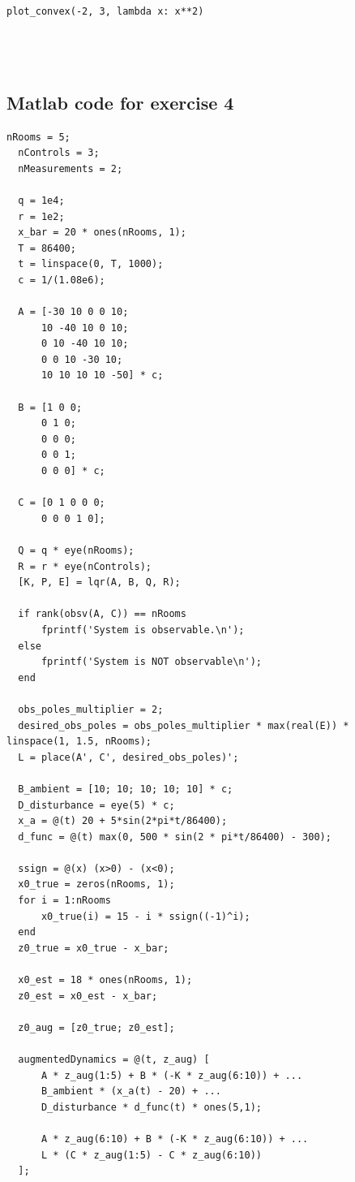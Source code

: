 \documentclass[12pt,A4, onecolumn]{exam}
\begin{document}
\begin{questions}
\begin{lstlisting}[style=pythonstyle]
  plot_convex(-2, 3, lambda x: x**2)




\end{lstlisting}

\subsection{Matlab code for exercise 4}

\begin{lstlisting}[style=matlabstyle]
  nRooms = 5;
  nControls = 3;
  nMeasurements = 2;

  q = 1e4;  
  r = 1e2;  
  x_bar = 20 * ones(nRooms, 1);
  T = 86400;
  t = linspace(0, T, 1000);
  c = 1/(1.08e6);

  A = [-30 10 0 0 10;
      10 -40 10 0 10;
      0 10 -40 10 10;
      0 0 10 -30 10;
      10 10 10 10 -50] * c;

  B = [1 0 0;
      0 1 0;
      0 0 0;
      0 0 1;
      0 0 0] * c;

  C = [0 1 0 0 0;   
      0 0 0 1 0];   

  Q = q * eye(nRooms);
  R = r * eye(nControls);
  [K, P, E] = lqr(A, B, Q, R);

  if rank(obsv(A, C)) == nRooms
      fprintf('System is observable.\n');
  else
      fprintf('System is NOT observable\n');
  end

  obs_poles_multiplier = 2;  
  desired_obs_poles = obs_poles_multiplier * max(real(E)) * linspace(1, 1.5, nRooms);
  L = place(A', C', desired_obs_poles)';

  B_ambient = [10; 10; 10; 10; 10] * c;
  D_disturbance = eye(5) * c;
  x_a = @(t) 20 + 5*sin(2*pi*t/86400);
  d_func = @(t) max(0, 500 * sin(2 * pi*t/86400) - 300);

  ssign = @(x) (x>0) - (x<0);
  x0_true = zeros(nRooms, 1);
  for i = 1:nRooms
      x0_true(i) = 15 - i * ssign((-1)^i);
  end
  z0_true = x0_true - x_bar;

  x0_est = 18 * ones(nRooms, 1);  
  z0_est = x0_est - x_bar;

  z0_aug = [z0_true; z0_est];

  augmentedDynamics = @(t, z_aug) [
      A * z_aug(1:5) + B * (-K * z_aug(6:10)) + ...  
      B_ambient * (x_a(t) - 20) + ...              
      D_disturbance * d_func(t) * ones(5,1);       
      
      A * z_aug(6:10) + B * (-K * z_aug(6:10)) + ... 
      L * (C * z_aug(1:5) - C * z_aug(6:10))         
  ];


\end{lstlisting}
\end{questions}
\end{document}
